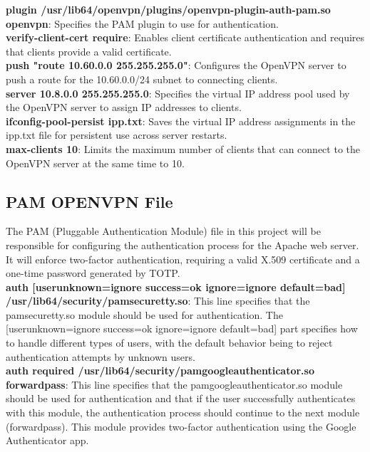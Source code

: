 \documentclass[12pt]{article}
\begin{document}
\textbf{plugin /usr/lib64/openvpn/plugins/openvpn-plugin-auth-pam.so openvpn}: Specifies the PAM plugin to use for authentication.\\

\textbf{verify-client-cert require}: Enables client certificate authentication and requires that clients provide a valid certificate.\\

\textbf{push "route 10.60.0.0 255.255.255.0"}: Configures the OpenVPN server to push a route for the 10.60.0.0/24 subnet to connecting clients.\\

\textbf{server 10.8.0.0 255.255.255.0}: Specifies the virtual IP address pool used by the OpenVPN server to assign IP addresses to clients.\\

\textbf{ifconfig-pool-persist ipp.txt}: Saves the virtual IP address assignments in the ipp.txt file for persistent use across server restarts.\\

\textbf{max-clients 10}: Limits the maximum number of clients that can connect to the OpenVPN server at the same time to 10.

\newpage

\subsection{PAM OPENVPN File}

The PAM (Pluggable Authentication Module) file in this project will be responsible for configuring the authentication process for the Apache web server. It will enforce two-factor authentication, requiring a valid X.509 certificate and a one-time password generated by TOTP.\\


\textbf{auth [user\textunderscore unknown=ignore success=ok ignore=ignore default=bad] /usr/lib64/security/pam\textunderscore securetty.so}: This line specifies that the pam\textunderscore securetty.so module should be used for authentication. The [user\textunderscore unknown=ignore success=ok ignore=ignore default=bad] part specifies how to handle different types of users, with the default behavior being to reject authentication attempts by unknown users.\\

\textbf{auth required /usr/lib64/security/pam\textunderscore google\textunderscore authenticator.so forward\textunderscore pass}: This line specifies that the pam\textunderscore google\textunderscore authenticator.so module should be used for authentication and that if the user successfully authenticates with this module, the authentication process should continue to the next module (forward\textunderscore pass). This module provides two-factor authentication using the Google Authenticator app.\\
\end{document}
